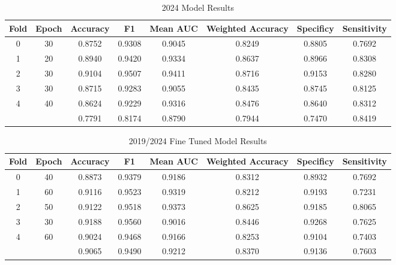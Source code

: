 \documentclass{article}
\begin{document}
\begin{table*}[t]
    \caption{2024 Model Results}
    \label{2024table}
    \vskip 0.15in
    \begin{center}
    \begin{small}
    \begin{sc}
    \begin{tabular*}{\linewidth}{@{\extracolsep{\fill}} cccccccc}
    \toprule
    Fold & Epoch & Accuracy & F1 & Mean AUC & Weighted Accuracy & Specificy & Sensitivity \\
    \midrule
    0 & 30 & 0.8752 & 0.9308 & 0.9045 & 0.8249 & 0.8805 & 0.7692 \\
    1 & 20 & 0.8940 & 0.9420 & 0.9334 & 0.8637 & 0.8966 & 0.8308 \\
    2 & 30 & 0.9104 & 0.9507 & 0.9411 & 0.8716 & 0.9153 & 0.8280 \\
    3 & 30 & 0.8715 & 0.9283 & 0.9055 & 0.8435 & 0.8745 & 0.8125 \\
    4 & 40 & 0.8624 & 0.9229 & 0.9316 & 0.8476 & 0.8640 & 0.8312 \\
    \midrule
      &    & 0.7791 & 0.8174 & 0.8790 & 0.7944 & 0.7470 & 0.8419 \\
    \bottomrule
    \end{tabular*}
    \end{sc}
    \end{small}
    \end{center}
    \vskip -0.1in
\end{table*}

\begin{table*}[t]
    \caption{2019/2024 Fine Tuned Model Results}
    \label{20192024table}
    \vskip 0.15in
    \begin{center}
    \begin{small}
    \begin{sc}
    \begin{tabular*}{\linewidth}{@{\extracolsep{\fill}} cccccccc}
    \toprule
    Fold & Epoch & Accuracy & F1 & Mean AUC & Weighted Accuracy & Specificy & Sensitivity \\
    \midrule
    0 & 40 & 0.8873 & 0.9379 & 0.9186 & 0.8312 & 0.8932 & 0.7692 \\
    1 & 60 & 0.9116 & 0.9523 & 0.9319 & 0.8212 & 0.9193 & 0.7231 \\
    2 & 50 & 0.9122 & 0.9518 & 0.9373 & 0.8625 & 0.9185 & 0.8065 \\
    3 & 30 & 0.9188 & 0.9560 & 0.9016 & 0.8446 & 0.9268 & 0.7625 \\
    4 & 60 & 0.9024 & 0.9468 & 0.9166 & 0.8253 & 0.9104 & 0.7403 \\
    \midrule
      &    & 0.9065 & 0.9490 & 0.9212 & 0.8370 & 0.9136 & 0.7603 \\
    \bottomrule
    \end{tabular*}
    \end{sc}
    \end{small}
    \end{center}
    \vskip -0.1in
\end{table*}




\end{document}
